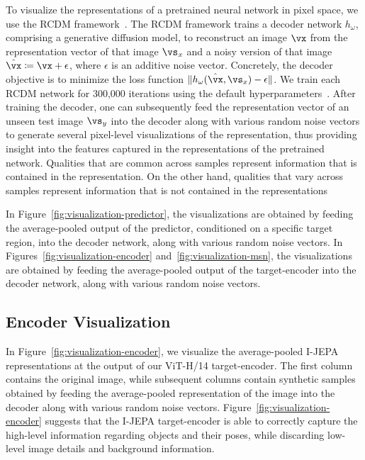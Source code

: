 \documentclass[10pt,twocolumn,letterpaper]{article}
\newcommand{\putalg}{{I-JEPA}\xspace}
\begin{document}
To visualize the representations of a pretrained neural network in pixel space, we use the RCDM framework~\cite{bordes2022high}.
The RCDM framework trains a decoder network $h_\omega$, comprising a generative diffusion model, to reconstruct an image $\vx$ from the representation vector of that image $\vs_x$ and a noisy version of that image $\hat{\vx} \coloneqq \vx + \epsilon$, where $\epsilon$ is an additive noise vector.
Concretely, the decoder objective is to minimize the loss function $\lVert h_\omega(\hat{\vx}, \vs_x) - \epsilon \rVert$.
We train each RCDM network for 300,000 iterations 
using the default hyperparameters~\cite{bordes2022high}.
After training the decoder, one can subsequently feed the representation vector of an unseen test image $\vs_y$ into the decoder along with various random noise vectors to generate several pixel-level visualizations of the representation, thus providing insight into the features captured in the representations of the pretrained network.
Qualities that are common across samples represent information that is contained in the representation.
On the other hand, qualities that vary across samples represent information that is not contained in the representations

In Figure~\ref{fig:visualization-predictor}, the visualizations are obtained by feeding the average-pooled output of the predictor, conditioned on a specific target region, into the decoder network, along with various random noise vectors.
In Figures~\ref{fig:visualization-encoder} and~\ref{fig:visualization-msn}, the visualizations are obtained by feeding the average-pooled output of the target-encoder into the decoder network, along with various random noise vectors.

\subsection{Encoder Visualization}

In Figure~\ref{fig:visualization-encoder}, we visualize the average-pooled \putalg representations at the output of our ViT-H/14 target-encoder.
The first column contains the original image, while subsequent columns contain synthetic samples obtained by feeding the average-pooled representation of the image into the decoder along with various random noise vectors.
Figure~\ref{fig:visualization-encoder} suggests that   the \putalg target-encoder is able to correctly capture the high-level information regarding objects and their poses, while discarding low-level image details and background information.
\end{document}
